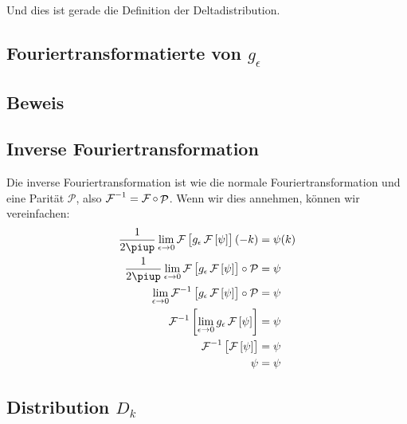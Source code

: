 Und dies ist gerade die Definition der Deltadistribution.

\subsection{Fouriertransformatierte von $g_\epsilon$}

\fehlt

\subsection{Beweis}

\fehlt

\subsection{Inverse Fouriertransformation}

Die inverse Fouriertransformation ist wie die normale Fouriertransformation und
eine Parität $\mathcal P$, also $\operatorname{\mathcal{F}}^{-1} = \operatorname{\mathcal{F}} \circ
\mathop{\mathcal P}$. Wenn wir dies annehmen, können wir vereinfachen:
\begin{align*}
	\frac1{2\piup} \lim_{\epsilon\to0} \fourier\sbr{g_\epsilon \fourier\sbr\psi}(-k)
	&= \psi(k) \\
	\frac1{2\piup} \lim_{\epsilon\to0} \fourier\sbr{g_\epsilon \fourier\sbr\psi} \circ \mathcal P
	&= \psi \\
	\lim_{\epsilon\to0} \fourier^{-1}\sbr{g_\epsilon \fourier\sbr\psi} \circ \mathcal P
	&= \psi \\
	\fourier^{-1}\sbr{\lim_{\epsilon\to0} g_\epsilon \fourier\sbr\psi}
	&= \psi \\
	\fourier^{-1}\sbr{\fourier\sbr\psi}
	&= \psi \\
	\psi &= \psi
\end{align*}

\subsection{Distribution $D_k$}

